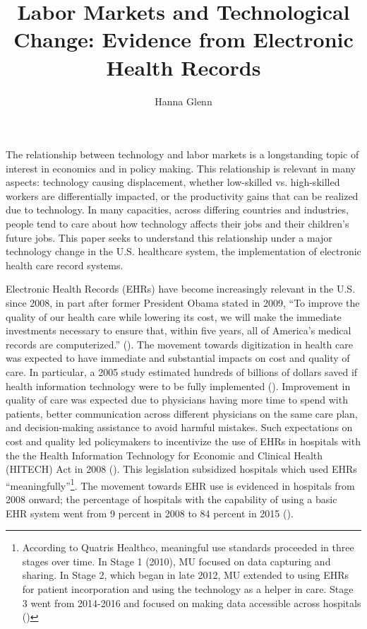 \documentclass[11pt]{article}
\title{Labor Markets and Technological Change: Evidence from Electronic Health Records}
\author{Hanna Glenn}
\begin{document}
\maketitle



\vspace{1.5cm}

The relationship between technology and labor markets is a longstanding topic of interest in economics and in policy making. This relationship is relevant in many aspects: technology causing displacement, whether low-skilled vs. high-skilled workers are differentially impacted, or the productivity gains that can be realized due to technology. In many capacities, across differing countries and industries, people tend to care about how technology affects their jobs and their children's future jobs. This paper seeks to understand this relationship under a major technology change in the U.S. healthcare system, the implementation of electronic health care record systems. 

Electronic Health Records (EHRs) have become increasingly relevant in the U.S. since 2008, in part after former President Obama stated in 2009, “To improve the quality of our health care while lowering its cost, we will make the immediate investments necessary to ensure that, within five years, all of America’s medical records are computerized.” (\cite{presquote}). The movement towards digitization in health care was expected to have immediate and substantial impacts on cost and quality of care. In particular, a 2005 study estimated hundreds of billions of dollars saved if health information technology were to be fully implemented (\cite{hillestad2005}). Improvement in quality of care was expected due to physicians having more time to spend with patients, better communication across different physicians on the same care plan, and decision-making assistance to avoid harmful mistakes. Such expectations on cost and quality led policymakers to incentivize the use of EHRs in hospitals with the the Health Information Technology for Economic and Clinical Health (HITECH) Act in 2008 (\cite{hitech}). This legislation subsidized hospitals which used EHRs “meaningfully”\footnote{According to Quatris Healthco, meaningful use standards proceeded in three stages over time. In Stage 1 (2010), MU focused on data capturing and sharing. In Stage 2, which began in late 2012, MU extended to using EHRs for patient incorporation and using the technology as a helper in care. Stage 3 went from 2014-2016 and focused on making data accessible across hospitals (\cite{meanuse})}. The movement towards EHR use is evidenced in hospitals from 2008 onward; the percentage of hospitals with the capability of using a basic EHR system went from 9 percent in 2008 to 84 percent in 2015 (\cite{stats}).
\end{document}
